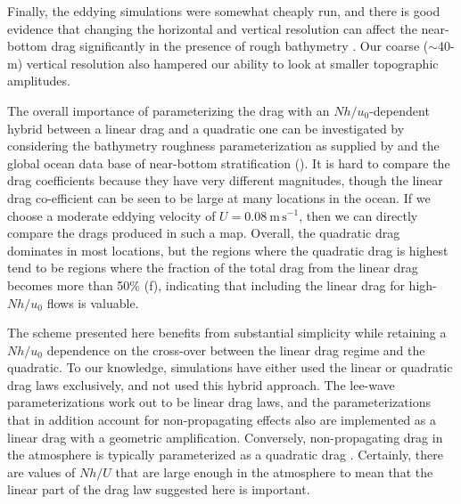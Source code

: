 \documentclass[twocol]{ametsocV5}
\newcommand{\tempS}[1]{}
\begin{document}
Finally, the eddying simulations were somewhat cheaply run, and there is good evidence that changing the horizontal and vertical resolution can affect the near-bottom drag significantly in the presence of rough bathymetry \citep{klymak18}.  Our coarse ($\sim$40-m) vertical resolution also hampered our ability to look at smaller  topographic amplitudes.

The overall importance of parameterizing the drag with an $Nh/u_0$-dependent hybrid between a linear drag and a quadratic one can be investigated by considering the bathymetry roughness parameterization as supplied by \citep{goffarbic10} and the global ocean data base of near-bottom stratification ().  It is hard to compare the drag coefficients because they have very different magnitudes, though the linear drag co-efficient can be seen to be large at many locations in the ocean.  If we choose a moderate eddying velocity of $U=0.08\ \mathrm{m\,s^{-1}}$, then we can directly compare the drags produced in such a map.  Overall, the quadratic drag dominates in most locations, but the regions where the quadratic drag is highest tend to be regions where the fraction of the total drag from the linear drag becomes more than 50\% (f), indicating that including the linear drag for high-$Nh/u_0$ flows is valuable.



The scheme presented here benefits from substantial simplicity while retaining a $Nh/u_0$ dependence on the cross-over between the linear drag regime and the quadratic.  To our knowledge, simulations have either used the linear or quadratic drag laws exclusively, and not used this hybrid approach.  The lee-wave parameterizations \citep[i.e.][]{nikurashinferrari14} work out to be linear drag laws, and the parameterizations that in addition account for non-propagating effects \citep[][]{trossmanetal13, trossmanetal2016} also are implemented as a linear drag with a geometric amplification.  Conversely, non-propagating drag in the atmosphere is typically parameterized as a quadratic drag \citep{LottMiller97, ScinoccaMcFarlane00}.  Certainly, there are values of $Nh/U$ that are large enough in the atmosphere to mean that the linear part of the drag law suggested here is important.
\end{document}
